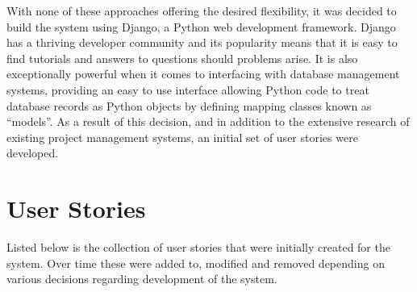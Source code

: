 \documentclass[a4paper]{l3proj}
\begin{document}
With none of these approaches offering the desired flexibility, it was decided to build the system using Django, a Python web development framework. Django has a thriving developer community and its popularity means that it is easy to find tutorials and answers to questions should problems arise. It is also exceptionally powerful when it comes to interfacing with database management systems, providing an easy to use interface allowing Python code to treat database records as Python objects by defining mapping classes known as “models”. As a result of this decision, and in addition to the extensive research of existing project management systems, an initial set of user stories were developed.

\section{User Stories}
\label{userStories}

Listed below is the collection of user stories that were initially created for the system.  Over time these were added to, modified and removed depending on various decisions regarding development of the system.
\end{document}
